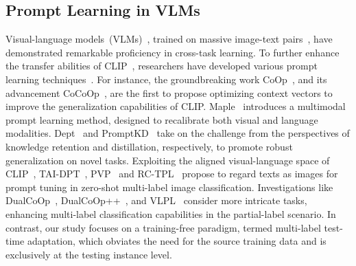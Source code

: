 \subsection{Prompt Learning in VLMs}
Visual-language models~(VLMs)~\citep{VLMs-ALBEF,VLMs-RegionCLIP,VLMs-Openai-CLIP,VLMs-BLIP-2,VLMs-XVLM2}, trained on massive image-text pairs~\citep{ITP-CC3M,ITP-Laion-5b}, have demonstrated remarkable proficiency in cross-task learning. To further enhance the transfer abilities of CLIP~\citep{VLMs-Openai-CLIP}, researchers have developed various prompt learning techniques~\citep{Prompt-CoOp,Prompt-CoCoOp,Prompt-MAPLE,Prompt-PromptKD,Prompt-TCP,TAI-TAIDPT,TAI-PVP}. For instance, the groundbreaking work CoOp~\citep{Prompt-CoOp}, and its advancement CoCoOp~\citep{Prompt-CoCoOp}, are the first to propose optimizing context vectors to improve the generalization capabilities of CLIP. Maple~\citep{Prompt-MAPLE} introduces a multimodal prompt learning method, designed to recalibrate both visual and language modalities. Dept~\citep{Prompt-DEPT} and PromptKD~\citep{Prompt-PromptKD} take on the challenge from the perspectives of knowledge retention and distillation, respectively, to promote robust generalization on novel tasks. Exploiting the aligned visual-language space of CLIP~\citep{VLMs-Openai-CLIP}, TAI-DPT~\citep{TAI-TAIDPT}, PVP~\citep{TAI-PVP} and RC-TPL~\citep{TAI-RC-TPL} propose to regard texts as images for prompt tuning in zero-shot multi-label image classification. Investigations like DualCoOp~\citep{Prompt-DualCoOp}, DualCoOp++~\citep{Prompt-DualCoOp++}, and VLPL~\citep{Prompt-VLPL} consider more intricate tasks, enhancing multi-label classification capabilities in the partial-label scenario. In contrast, our study focuses on a training-free paradigm, termed multi-label test-time adaptation, which obviates the need for the source training data and is exclusively at the testing instance level.